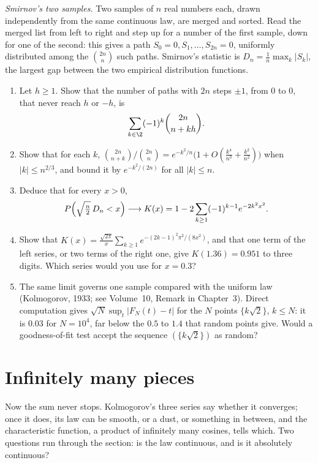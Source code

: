 \begin{exercise}[Journey]\label{pb:smirnov}
\emph{Smirnov's two samples.} Two samples of $n$ real numbers each, drawn independently from the same continuous law, are merged and sorted. Read the merged
list from left to right and step up for a number of the first sample, down for one of the second: this gives a path $S_0=0,S_1,\dots,S_{2n}=0$, uniformly
distributed among the $\binom{2n}n$ such paths. Smirnov's statistic is $D_n=\frac1n\max_k|S_k|$, the largest gap between the two empirical distribution functions.
\begin{enumerate}[label=(\alph*)]
\item Let $h\ge1$. Show that the number of paths with $2n$ steps $\pm1$, from $0$ to $0$, that never reach $h$ or $-h$, is
\[
\sum_{k\in\Z}(-1)^k\binom{2n}{n+kh}.
\]
\item Show that for each $k$, $\binom{2n}{n+k}\big/\binom{2n}n=e^{-k^2/n}\bigl(1+O(\frac{k^4}{n^3}+\frac{k^2}{n^2})\bigr)$ when $|k|\le n^{2/3}$, and bound it by $e^{-k^2/(2n)}$ for all $|k|\le n$.
\item Deduce that for every $x>0$,
\[
P\Bigl(\sqrt{\tfrac n2}\,D_n<x\Bigr)\longrightarrow K(x)=1-2\sum_{k\ge1}(-1)^{k-1}e^{-2k^2x^2}.
\]
\item Show that $K(x)=\frac{\sqrt{2\pi}}x\sum_{k\ge1}e^{-(2k-1)^2\pi^2/(8x^2)}$, and that one term of the left series, or two terms of the right one, give $K(1.36)=0.951$ to three digits. Which series would you use for $x=0.3$?
\item The same limit governs one sample compared with the uniform law (Kolmogorov, 1933; see Volume~10, Remark in Chapter~3). Direct computation gives
$\sqrt N\sup_t|F_N(t)-t|$ for the $N$ points $\{k\sqrt2\}$, $k\le N$: it is $0.03$ for $N=10^4$, far below the $0.5$ to $1.4$ that random points give. Would a goodness-of-fit
test accept the sequence $(\{k\sqrt2\})$ as random?
\end{enumerate}
\end{exercise}

\section{Infinitely many pieces}

Now the sum never stops. Kolmogorov's three series say whether it converges; once it does, its law can be smooth, or a dust, or something in between,
and the characteristic function, a product of infinitely many cosines, tells which. Two questions run through the section: is the law continuous, and is it
absolutely continuous?

